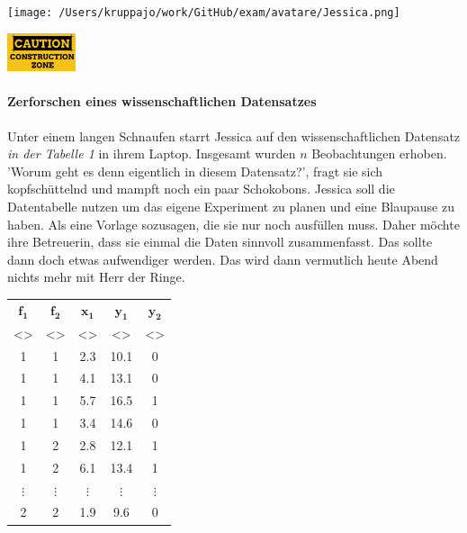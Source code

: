 \documentclass[a4paper, 9pt]{scrartcl}\usepackage[]{graphicx}\usepackage[]{xcolor}
\begin{document}
 
\ifcollection
\begin{flushright}
\tiny\vspace{-3Ex}
\textbf{\examinhaltstart}
\exammodulebiostat
\vspace{-4Ex}
\end{flushright}
\begin{minipage}[t]{0.5\textwidth}
\texttt{[image: /Users/kruppajo/work/GitHub/exam/avatare/Jessica.png]}
\end{minipage}
\begin{minipage}[t]{0.5\textwidth}
\hfill
\href{https://youtu.be/C9skfFRTHhI}{\includegraphics[width = 2cm]{img/caution}}
\end{minipage}
\fi



\ifcollection
\paragraph{Zerforschen eines wissenschaftlichen Datensatzes}
\fi

Unter einem langen Schnaufen starrt Jessica auf den wissenschaftlichen Datensatz \textit{in der Tabelle 1} in ihrem Laptop. Insgesamt wurden $n$ Beobachtungen erhoben. 'Worum geht es denn eigentlich in diesem Datensatz?', fragt sie sich kopfschüttelnd und mampft noch ein paar Schokobons. Jessica soll die Datentabelle nutzen um das eigene Experiment zu planen und eine Blaupause zu haben. Als eine Vorlage sozusagen, die sie nur noch ausfüllen muss. Daher möchte ihre Betreuerin, dass sie einmal die Daten sinnvoll zusammenfasst. Das sollte dann doch etwas aufwendiger werden. Das wird dann vermutlich heute Abend nichts mehr mit Herr der Ringe.

\begin{table}[h]
\centering
\Large
  \begin{tabular}{ccccc}
  \toprule
   $\boldsymbol{f_1}$  & $\boldsymbol{f_2}$ & $\boldsymbol{x_1}$ & $\boldsymbol{y_1}$ & $\boldsymbol{y_2}$ \\[2pt]
     <\phantom{xxx}>  & <\phantom{xxx}> & <\phantom{xxx}> & <\phantom{xxx}> & <\phantom{xxx}> \\[2pt] 
  \midrule
  1  & 1 & 2.3 & 10.1 & 0 \\  
  1  & 1 & 4.1 & 13.1 & 0 \\ 
  1  & 1 & 5.7 & 16.5 & 1 \\ 
  1  & 1 & 3.4 & 14.6 & 0 \\
  1  & 2 & 2.8 & 12.1 & 1 \\
  1  & 2 & 6.1 & 13.4 & 1 \\
  $\vdots$  & $\vdots$ & $\vdots$ & $\vdots$ & $\vdots$\\
  2 & 2  & 1.9 & 9.6 &  0\\
  \bottomrule
  \end{tabular}
\end{table}
\end{document}
